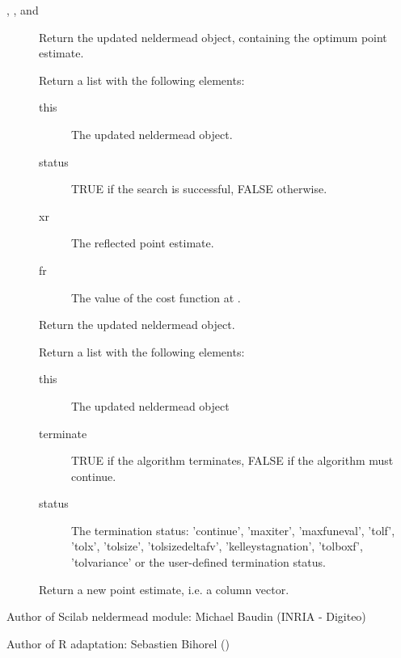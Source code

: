 \begin{Value}
\begin{description}

\item[, , and
] Return the updated neldermead object, containing the
optimum point estimate.
\item[] Return a list with the following elements:
\begin{description}

\item[this] The updated neldermead object.
\item[status] TRUE if the search is successful, FALSE otherwise.
\item[xr] The reflected point estimate.
\item[fr] The value of the cost function at .

\end{description}


\item[] Return the updated neldermead object.
\item[] Return a list with the following
elements: \begin{description}

\item[this] The updated neldermead object
\item[terminate] TRUE if the algorithm terminates, FALSE if the algorithm
must continue.
\item[status] The termination status: 'continue', 'maxiter', 'maxfuneval',
'tolf', 'tolx', 'tolsize', 'tolsizedeltafv', 'kelleystagnation',
'tolboxf', 'tolvariance' or the user-defined termination status.

\end{description}


\item[] Return a new point estimate, i.e. a
column vector.

\end{description}

\end{Value}
%
\begin{Author}\relax
Author of Scilab neldermead module: Michael Baudin (INRIA - Digiteo)

Author of R adaptation: Sebastien Bihorel ()
\end{Author}

